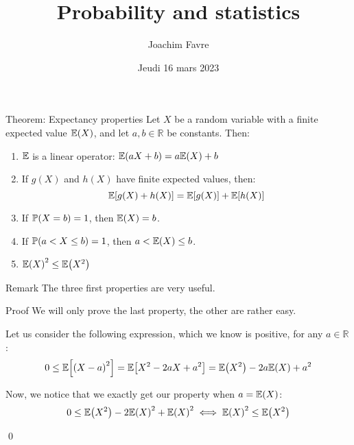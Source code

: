 \documentclass[a4paper]{article}
\title{Probability and statistics}
\author{Joachim Favre}
\date{Jeudi 16 mars 2023}
\begin{document}
\maketitle


\begin{parag}{Theorem: Expectancy properties}
    Let $X$ be a random variable with a finite expected value $\exval\left(X\right)$, and let $a, b \in \mathbb{R}$ be constants. Then:
    \begin{enumerate}
        \item $\mathbb{E}$ is a linear operator: $\exval\left(aX + b\right) = a\exval\left(X\right) + b$
        \item If $g\left(X\right)$ and $h\left(X\right)$ have finite expected values, then: 
        \[\exval\left[g\left(X\right) + h\left(X\right)\right] = \exval\left[g\left(X\right)\right] + \exval\left[h\left(X\right)\right]\]
        
        \item If $\prob\left(X = b\right) = 1$, then $\exval\left(X\right) = b$.
        \item If $\prob\left(a < X \leq b\right) = 1$, then $a < \exval\left(X\right) \leq b$.
        \item $\exval\left(X\right)^2 \leq \exval\left(X^2\right)$
    \end{enumerate}

    \begin{subparag}{Remark}
        The three first properties are very useful.
    \end{subparag}

    \begin{subparag}{Proof}
        We will only prove the last property, the other are rather easy.

        Let us consider the following expression, which we know is positive, for any $a \in \mathbb{R}$: 
        \[0 \leq \exval\left[\left(X  - a\right)^2\right] = \exval\left[X^2- 2aX + a ^2\right] = \exval\left(X^2\right)  - 2a\exval\left(X\right) + a ^2\]

        Now, we notice that we exactly get our property when $a = \exval\left(X\right)$: 
        \[0 \leq \exval\left(X^2\right) - 2 \exval\left(X\right)^2 + \exval\left(X\right)^2 \iff \exval\left(X\right)^2 \leq \exval\left(X^2\right)\]
        
        \qed
    \end{subparag}
\end{parag}
\end{document}

